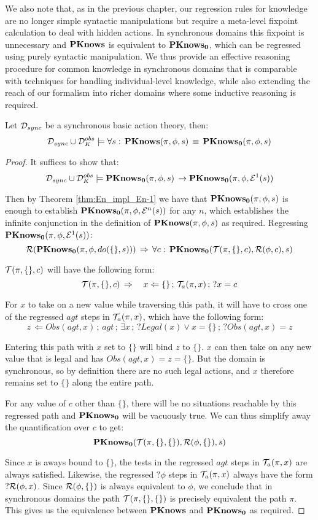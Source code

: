 We also note that, as in the previous chapter, our regression rules
for knowledge are no longer simple syntactic manipulations but require
a meta-level fixpoint calculation to deal with hidden actions. In
synchronous domains this fixpoint is unnecessary and $\mathbf{PKnows}$ is
equivalent to $\mathbf{PKnows_{0}}$, which can be regressed using purely syntactic
manipulation. We thus provide an effective reasoning procedure for
common knowledge in synchronous domains that is comparable with techniques
for handling individual-level knowledge, while also extending the
reach of our formalism into richer domains where some inductive reasoning
is required.

\begin{thm}
Let $\mathcal{D}_{sync}$ be a synchronous basic action theory, then:\[
\mathcal{D}_{sync}\cup\mathcal{D}_{K}^{obs}\models\forall s:\,\mathbf{PKnows}(\pi,\phi,s)\,\equiv\,\mathbf{PKnows_{0}}(\pi,\phi,s)\]

\end{thm}
\begin{proof}
It suffices to show that:\[
\mathcal{D}_{sync}\cup\mathcal{D}_{K}^{obs}\models\mathbf{PKnows_{0}}(\pi,\phi,s)\,\rightarrow\mathbf{PKnows_{0}}(\pi,\phi,\mathcal{E}^{1}(s))\]


Then by Theorem \ref{thm:En_impl_En-1} we have that $\mathbf{PKnows_{0}}(\pi,\phi,s)$
is enough to establish $\mathbf{PKnows_{0}}(\pi,\phi,\mathcal{E}^{n}(s))$ for
any $n$, which establishes the infinite conjunction in the definition
of $\mathbf{PKnows}(\pi,\phi,s)$ as required. Regressing $\mathbf{PKnows_{0}}(\pi,\phi,\mathcal{E}^{1}(s))$:\[
\mathcal{R}(\mathbf{PKnows_{0}}(\pi,\phi,do(\{\},s)))\,\Rightarrow\,\forall c:\,\mathbf{PKnows_{0}}(\mathcal{T}(\pi,\{\},c),\mathcal{R}(\phi,c),s)\]


$\mathcal{T}(\pi,\{\},c)$ will have the following form:\[
\mathcal{T}(\pi,\{\},c)\,\Rightarrow\,\,\,\,\,\, x\Leftarrow\{\}\,;\,\mathcal{T}_{a}(\pi,x)\,;\,?x=c\]


For $x$ to take on a new value while traversing this path, it will
have to cross one of the regressed $agt$ steps in $\mathcal{T}_{a}(\pi,x)$,
which have the following form:\[
z\,\Leftarrow Obs(agt,x)\,;\, agt\,;\,\exists x\,;\,?Legal(x)\vee x=\{\}\,;\,?Obs(agt,x)=z\]


Entering this path with $x$ set to $\{\}$ will bind $z$ to $\{\}$.
$x$ can then take on any new value that is legal and has $Obs(agt,x)=z=\{\}$.
But the domain is synchronous, so by definition there are no such
legal actions, and $x$ therefore remains set to $\{\}$ along the
entire path.

For any value of $c$ other than $\{\}$, there will be no situations
reachable by this regressed path and $\mathbf{PKnows_{0}}$ will be vacuously
true. We can thus simplify away the quantification over $c$ to get:\[
\mathbf{PKnows_{0}}(\mathcal{T}(\pi,\{\},\{\}),\mathcal{R}(\phi,\{\}),s)\]


Since $x$ is aways bound to $\{\}$, the tests in the regressed $agt$
steps in $\mathcal{T}_{a}(\pi,x)$ are always satisfied. Likewise, the regressed
$?\phi$ steps in $\mathcal{T}_{a}(\pi,x)$ always have the form $?\mathcal{R}(\phi,x)$.
Since $\mathcal{R}(\phi,\{\})$ is always equivalent to $\phi$, we conclude
that in synchronous domains the path $\mathcal{T}(\pi,\{\},\{\})$ is precisely
equivalent the path $\pi$. This gives us the equivalence between
$\mathbf{PKnows}$ and $\mathbf{PKnows_{0}}$ as required. 
\end{proof}

